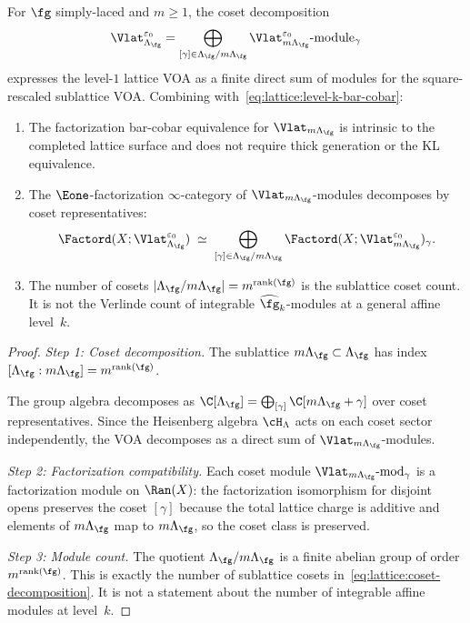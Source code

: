 \begin{theorem}
\label{thm:lattice:level-k-dk}
For $\fg$ simply-laced and $m \geq 1$, the coset decomposition
\begin{equation}\label{eq:lattice:coset-decomposition}
\Vlat_{\Lambda_\fg}^{\varepsilon_0}
= \bigoplus_{[\gamma] \in \Lambda_\fg/m\Lambda_\fg}
 \Vlat_{m\Lambda_\fg}^{\varepsilon_0}\text{-module}_\gamma
\end{equation}
expresses the level-$1$ lattice VOA as a finite direct sum of
modules for the square-rescaled sublattice VOA. Combining
with~\eqref{eq:lattice:level-k-bar-cobar}:
\begin{enumerate}[label=(\roman*)]
\item The factorization bar-cobar equivalence for
 $\Vlat_{m\Lambda_\fg}$ is intrinsic to the completed lattice
 surface and does not require thick generation or the KL equivalence.
\item The $\Eone$-factorization $\infty$-category of
 $\Vlat_{m\Lambda_\fg}$-modules decomposes by coset
 representatives:
 \[
 \Factord(X; \Vlat_{\Lambda_\fg}^{\varepsilon_0})
 \;\simeq\;
 \bigoplus_{[\gamma] \in \Lambda_\fg/m\Lambda_\fg}
 \Factord(X;
 \Vlat_{m\Lambda_\fg}^{\varepsilon_0})_\gamma.
 \]
\item The number of cosets
 $|\Lambda_\fg/m\Lambda_\fg| = m^{\operatorname{rank}(\fg)}$ is the
 sublattice coset count. It is not the Verlinde count of integrable
 $\widehat{\fg}_k$-modules at a general affine level~$k$.
\end{enumerate}
\end{theorem}

\begin{proof}
\emph{Step 1: Coset decomposition.}
The sublattice $m\Lambda_\fg \subset \Lambda_\fg$ has index
$[\Lambda_\fg:m\Lambda_\fg]=m^{\operatorname{rank}(\fg)}$.

The group algebra decomposes as
$\C[\Lambda_\fg] =
\bigoplus_{[\gamma]} \C[m\Lambda_\fg + \gamma]$
over coset representatives. Since the Heisenberg algebra
$\cH_\Lambda$ acts on each coset sector independently, the VOA
decomposes as a direct sum of $\Vlat_{m\Lambda_\fg}$-modules.

\emph{Step 2: Factorization compatibility.}
Each coset module
$\Vlat_{m\Lambda_\fg}\text{-mod}_\gamma$ is a
factorization module on $\Ran(X)$: the factorization isomorphism
for disjoint opens preserves the coset $[\gamma]$ because the
total lattice charge is additive and elements of
$m\Lambda_\fg$ map to $m\Lambda_\fg$, so the coset
class is preserved.

\emph{Step 3: Module count.}
The quotient $\Lambda_\fg/m\Lambda_\fg$ is a finite abelian group of
order $m^{\operatorname{rank}(\fg)}$. This is exactly the number of
sublattice cosets in~\eqref{eq:lattice:coset-decomposition}. It is
not a statement about the number of integrable affine modules at
level~$k$.
\end{proof}


